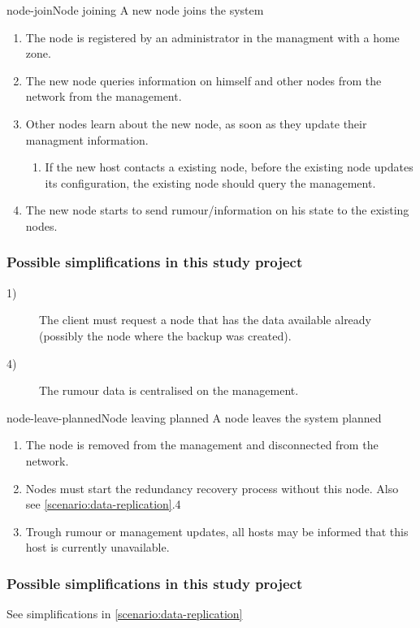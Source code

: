 \begin{scenario}{node-join}{Node joining}
    A new node joins the system
    
    \begin{enumerate}
    	\item The node is registered by an administrator in the managment with a home zone.
    	\item The new node queries information on himself and other nodes from the network from the management.
    	\item Other nodes learn about the new node, as soon as they update their managment information.
    		\begin{enumerate}
    			\item If the new host contacts a existing node, before the existing node updates its configuration, the existing node should query the management.
    		\end{enumerate}
    	\item The new node starts to send rumour/information on his state to the existing nodes.
    \end{enumerate}
    
	\subsubsection{Possible simplifications in this study project}
	\begin{description}
		 \item[1)] The client must request a node that has the data available already (possibly the node where the backup was created).
		 \item[4)] The rumour data is centralised on the management.
	\end{description}
\end{scenario}

\begin{scenario}{node-leave-planned}{Node leaving planned}
    A node leaves the system planned
    \begin{enumerate}
    	\item The node is removed from the management and disconnected from the network.
    	\item Nodes must start the redundancy recovery process without this node.
    		Also see \ref{scenario:data-replication}.4
    	\item Trough rumour or management updates, all hosts may be informed that this host is currently unavailable.
    \end{enumerate}
    
	\subsubsection{Possible simplifications in this study project}
		See simplifications in \ref{scenario:data-replication}
\end{scenario}

